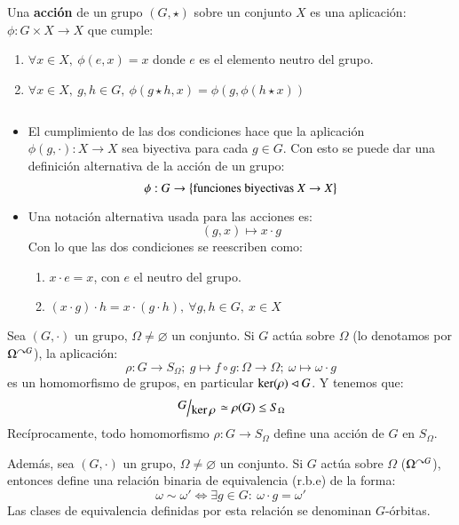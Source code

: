 \begin{dfn}
    Una \textbf{acción} de un grupo $(G, \star)$ sobre un conjunto $X$ es una aplicación: $\phi: G \times X \to X$ que cumple:
    \begin{enumerate}
        \item $ \forall x \in X,\ \phi(e, x) = x$ donde $e$ es el elemento neutro del grupo.
        \item $ \forall x \in X,\ g, h \in G,\ \phi(g \star h, x) = \phi(g, \phi(h \star x))$
    \end{enumerate}
\end{dfn}
\begin{obs}$ $
    \begin{itemize}
        \item El cumplimiento de las dos condiciones hace que la aplicación $\phi(g, \cdot): X \to X$ sea biyectiva para cada $g \in G$. Con esto se puede dar una definición alternativa de la acción de un grupo:
        $$
            \phi: G \to \left\{\text{funciones biyectivas } X \to X\right\}
        $$
        \item Una notación alternativa usada para las acciones es:
        $$
            (g, x) \mapsto x \cdot g
        $$
        Con lo que las dos condiciones se reescriben como:
        \begin{enumerate}
            \item $x \cdot e = x$, con $e$ el neutro del grupo.
            \item $(x \cdot g) \cdot h = x \cdot (g \cdot h),\ \forall g,h \in G,\ x \in X$
        \end{enumerate}
    \end{itemize}
\end{obs}

\begin{pro}
    Sea $(G, \cdot)$ un grupo, $\Omega \neq \varnothing$ un conjunto. Si $G$ actúa sobre $\Omega$ (lo denotamos por $\Omega^{\curvearrowright G}$), la aplicación:
    $$
        \rho: G \to S_{\Omega};\ g \mapsto f \circ g: \Omega \to \Omega;\ \omega \mapsto \omega \cdot g
    $$
    es un homomorfismo de grupos, en particular $\ker(\rho) \lhd G$. Y tenemos que:
    $$
        \quo{G}{\ker \rho} \isom \rho(G) \leq S_{\Omega}
    $$
    Recíprocamente, todo homomorfismo $\rho: G \to S_\Omega $ define una acción de $G$ en $S_\Omega$.
\end{pro}

Además, sea $(G, \cdot)$ un grupo, $\Omega \neq \varnothing$ un conjunto. Si $G$ actúa sobre $\Omega$ ($\Omega^{\curvearrowright G}$), entonces define una relación binaria de equivalencia (r.b.e) de la forma:
$$
    \omega \sim \omega' \iff \exists g \in G:\ \omega \cdot g = \omega'
$$
Las clases de equivalencia definidas por esta relación se denominan $G$-órbitas.

